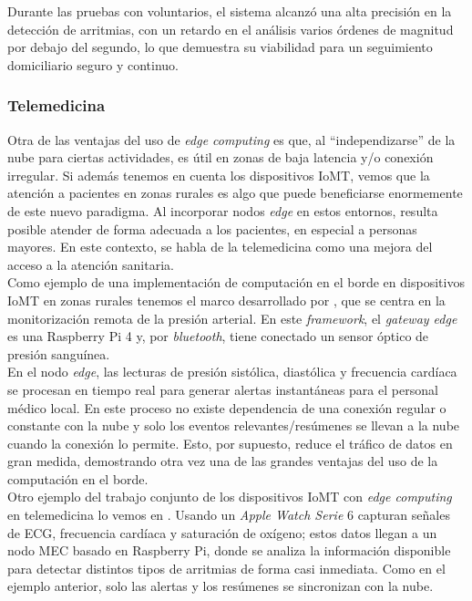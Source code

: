 \documentclass[twoside, 12pt]{opticajnl}
\begin{document}
Durante las pruebas con voluntarios, el sistema alcanzó una alta precisión en la detección de arritmias, con un retardo en el análisis varios órdenes de magnitud por debajo del segundo, lo que demuestra su viabilidad para un seguimiento domiciliario seguro y continuo.


\subsubsection{Telemedicina}

Otra de las ventajas del uso de \textit{edge computing} es que, al ``independizarse'' de la nube para ciertas actividades, es útil en zonas de baja latencia y/o conexión irregular. Si además tenemos en cuenta los dispositivos IoMT, vemos que la atención a pacientes en zonas rurales es algo que puede beneficiarse enormemente de este nuevo paradigma. Al incorporar nodos \textit{edge} en estos entornos, resulta posible atender de forma adecuada a los pacientes, en especial a personas mayores. En este contexto, se habla de la telemedicina como una mejora del acceso a la atención sanitaria. \\

Como ejemplo de una implementación de computación en el borde en dispositivos IoMT en zonas rurales tenemos el marco desarrollado por , que se centra en la monitorización remota de la presión arterial. En este \textit{framework}, el \textit{gateway edge} es una Raspberry Pi 4 y, por \textit{bluetooth}, tiene conectado un sensor óptico de presión sanguínea. \\

En el nodo \textit{edge}, las lecturas de presión sistólica, diastólica y frecuencia cardíaca se procesan en tiempo real para generar alertas instantáneas para el personal médico local. En este proceso no existe dependencia de una conexión regular o constante con la nube y solo los eventos relevantes/resúmenes se llevan a la nube cuando la conexión lo permite. Esto, por supuesto, reduce el tráfico de datos en gran medida, demostrando otra vez una de las grandes ventajas del uso de la computación en el borde. \\

Otro ejemplo del trabajo conjunto de los dispositivos IoMT con \textit{edge computing} en telemedicina lo vemos en . Usando un \textit{Apple Watch Serie} 6 capturan señales de ECG, frecuencia cardíaca y saturación de oxígeno; estos datos llegan a un nodo MEC basado en Raspberry Pi, donde se analiza la información disponible para detectar distintos tipos de arritmias de forma casi inmediata. Como en el ejemplo anterior, solo las alertas y los resúmenes se sincronizan con la nube. 
\end{document}
